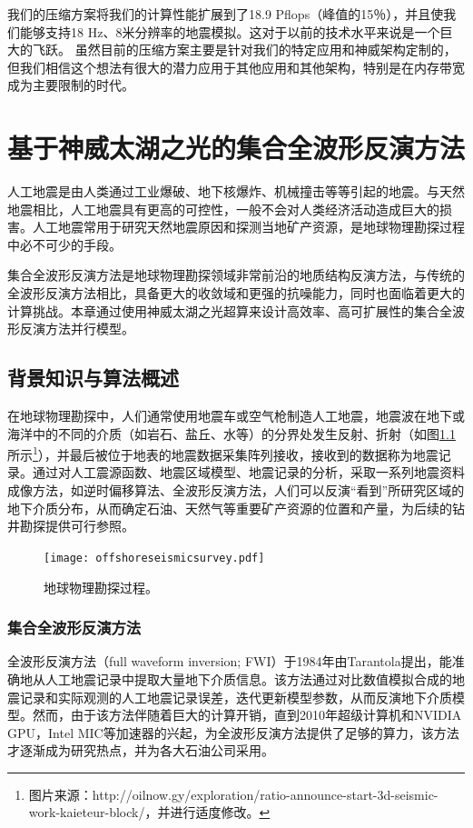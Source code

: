 \documentclass[degree=doctor]{thuthesis}
\begin{document}
我们的压缩方案将我们的计算性能扩展到了18.9 Pflops（峰值的15％），并且使我们能够支持18 Hz、8米分辨率的地震模拟。这对于以前的技术水平来说是一个巨大的飞跃。 虽然目前的压缩方案主要是针对我们的特定应用和神威架构定制的，但我们相信这个想法有很大的潜力应用于其他应用和其他架构，特别是在内存带宽成为主要限制的时代。

\chapter{基于神威太湖之光的集合全波形反演方法}

人工地震是由人类通过工业爆破、地下核爆炸、机械撞击等等引起的地震。与天然地震相比，人工地震具有更高的可控性，一般不会对人类经济活动造成巨大的损害。人工地震常用于研究天然地震原因和探测当地矿产资源，是地球物理勘探过程中必不可少的手段。

集合全波形反演方法是地球物理勘探领域非常前沿的地质结构反演方法，与传统的全波形反演方法相比，具备更大的收敛域和更强的抗噪能力，同时也面临着更大的计算挑战。本章通过使用神威太湖之光超算来设计高效率、高可扩展性的集合全波形反演方法并行模型。

\section{背景知识与算法概述}

在地球物理勘探中，人们通常使用地震车或空气枪制造人工地震，地震波在地下或海洋中的不同的介质（如岩石、盐丘、水等）的分界处发生反射、折射（如图\ref{fig:offshoreseismicsurvey}所示\footnote{图片来源：http://oilnow.gy/exploration/ratio-announce-start-3d-seismic-work-kaieteur-block/，并进行适度修改。}），并最后被位于地表的地震数据采集阵列接收，接收到的数据称为地震记录。通过对人工震源函数、地震区域模型、地震记录的分析，采取一系列地震资料成像方法，如逆时偏移算法、全波形反演方法，人们可以反演“看到”所研究区域的地下介质分布，从而确定石油、天然气等重要矿产资源的位置和产量，为后续的钻井勘探提供可行参照。

\begin{figure}[ht]
  \centering
  \texttt{[image: offshoreseismicsurvey.pdf]}
  \caption{地球物理勘探过程。}
  \label{fig:offshoreseismicsurvey}
\end{figure}

\subsection{集合全波形反演方法}

全波形反演方法（full waveform inversion; FWI）于1984年由Tarantola提出，能准确地从人工地震记录中提取大量地下介质信息\cite{tarantola1984inversion,plessix2012full,brossier2009seismic}。该方法通过对比数值模拟合成的地震记录和实际观测的人工地震记录误差，迭代更新模型参数，从而反演地下介质模型\cite{yushu}。然而，由于该方法伴随着巨大的计算开销，直到2010年超级计算机和NVIDIA GPU，Intel MIC等加速器的兴起，为全波形反演方法提供了足够的算力，该方法才逐渐成为研究热点，并为各大石油公司采用。
\end{document}
